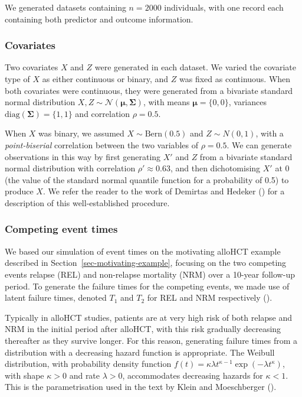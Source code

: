 \documentclass[
  letterpaper,
  DIV=11,
  numbers=noendperiod]{scrreprt}
\begin{document}
We generated datasets containing \(n = 2000\) individuals, with one
record each containing both predictor and outcome information.

\subsubsection{Covariates}\label{covariates}

Two covariates \(X\) and \(Z\) were generated in each dataset. We varied
the covariate type of \(X\) as either continuous or binary, and \(Z\)
was fixed as continuous. When both covariates were continuous, they were
generated from a bivariate standard normal distribution
\(X,Z \sim \mathcal{N}(\boldsymbol{\mu}, \boldsymbol{\Sigma})\), with
means \(\boldsymbol{\mu} = \{0, 0\}\), variances
\(\text{diag}(\boldsymbol{\Sigma}) = \{1, 1\}\) and correlation
\(\rho = 0.5\).

When \(X\) was binary, we assumed \(X \sim \text{Bern}(0.5)\) and
\(Z \sim N(0, 1)\), with a \emph{point-biserial} correlation between the
two variables of \(\rho = 0.5\). We can generate observations in this
way by first generating \(X'\) and \(Z\) from a bivariate standard
normal distribution with correlation \(\rho' \approx 0.63\), and then
dichotomising \(X'\) at 0 (the value of the standard normal quantile
function for a probability of 0.5) to produce \(X\). We refer the reader
to the work of Demirtas and Hedeker
() for
a description of this well-established procedure.

\subsubsection{Competing event times}\label{competing-event-times}

We based our simulation of event times on the motivating alloHCT example
described in Section~\ref{sec-motivating-example}, focusing on the two
competing events relapse (REL) and non-relapse mortality (NRM) over a
10-year follow-up period. To generate the failure times for the
competing events, we made use of latent failure times, denoted \(T_1\)
and \(T_2\) for REL and NRM respectively
().

Typically in alloHCT studies, patients are at very high risk of both
relapse and NRM in the initial period after alloHCT, with this risk
gradually decreasing thereafter as they survive longer. For this reason,
generating failure times from a distribution with a decreasing hazard
function is appropriate. The Weibull distribution, with probability
density function
\(f(t) = \kappa \lambda t^{\kappa - 1} \exp (-\lambda t^{\kappa})\),
with shape \(\kappa > 0\) and rate \(\lambda > 0\), accommodates
decreasing hazards for \(\kappa < 1\). This is the parametrisation used
in the text by Klein and Moeschberger
().
\end{document}
